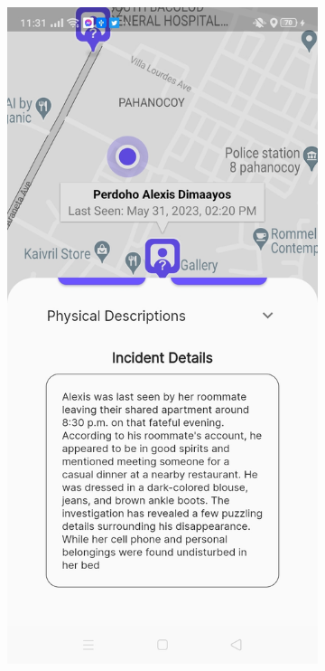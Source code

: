 \begin{figure}[!h]
\begin{subfigure}[c]{0.30\linewidth}
    \end{subfigure}
    \centering
    \begin{subfigure}[c]{0.30\linewidth}
        \centering
        \includegraphics[scale=0.15]{figures/Chapter4/Main/NearbyMP-2.jpg}

\end{subfigure}
\end{figure}

